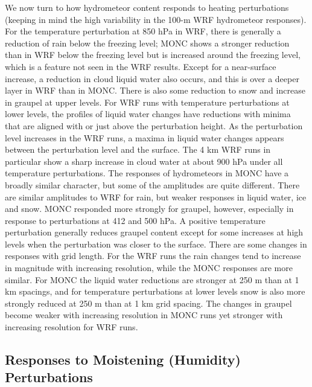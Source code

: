 \documentclass[draft]{agujournal2019}
\begin{document}
We now turn to how hydrometeor content responds to heating perturbations (keeping in mind the high variability in the 100-m WRF
hydrometeor responses). For the temperature perturbation at 850 hPa in WRF, there
is generally a reduction of rain below the freezing level; MONC shows a stronger
reduction than in WRF below the freezing level but is increased around the
freezing level, which is a feature not seen in the WRF results. Except for a
near-surface increase, a reduction in cloud liquid water also occurs, and this
is over a deeper layer in WRF than in MONC. There is also some reduction to snow
and increase in graupel at upper levels. For WRF runs with temperature
perturbations at lower levels, the profiles of liquid water changes have
reductions with minima that are aligned with or just above the perturbation
height. As the perturbation level increases in the WRF runs, a maxima in liquid
water changes appears between the perturbation level and the surface. The 4 km
WRF runs in particular show a sharp increase in cloud water at about 900 hPa
under all temperature perturbations. The responses of hydrometeors in MONC have
a broadly similar character, but some of the amplitudes are quite different.
There are similar amplitudes to WRF for rain, but weaker responses in liquid
water, ice and snow. MONC responded more strongly for graupel, however,
especially in response to perturbations at 412 and 500 hPa. A positive
temperature perturbation generally reduces graupel content except for some
increases at high levels when the perturbation was closer to the surface. There
are some changes in responses with grid length. For the WRF runs the rain
changes tend to increase in magnitude with increasing resolution, while the MONC
responses are more similar. For MONC the liquid water reductions are stronger at
250 m than at 1 km spacings, and for temperature perturbations at lower levels
snow is also more strongly reduced at 250 m than at 1 km grid spacing. The
changes in graupel become weaker with increasing resolution in MONC runs yet
stronger with increasing resolution for WRF runs. 

\subsection{Responses to Moistening (Humidity) Perturbations}
\end{document}

